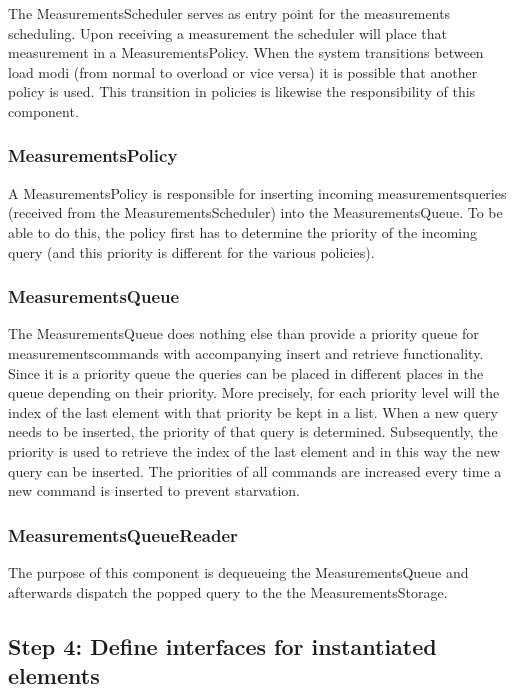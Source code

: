 \npar The MeasurementsScheduler serves as entry point for the measurements
scheduling. Upon receiving a measurement the scheduler will place that
measurement in a MeasurementsPolicy. When the system transitions between load
modi (from normal to overload or vice versa) it is possible that another policy
is used. This transition in policies is likewise the responsibility of this
component.

\subsubsection{MeasurementsPolicy}

\npar A MeasurementsPolicy is responsible for inserting incoming
measurementsqueries (received from the MeasurementsScheduler) into the
MeasurementsQueue. To be able to do this, the policy first has to determine the
priority of the incoming query (and this priority is different for the various
policies).

\subsubsection{MeasurementsQueue}

\npar The MeasurementsQueue does nothing else than provide a priority queue for
measurementscommands with accompanying insert and retrieve functionality. Since
it is a priority queue the queries can be placed in different places in the
queue depending on their priority. More precisely, for each priority level will
the index of the last element with that priority be kept in a list. When a new
query needs to be inserted, the priority of that query is determined.
Subsequently, the priority is used to retrieve the index of the last element and
in this way the new query can be inserted. The priorities of all commands are
increased every time a new command is inserted to prevent starvation.

\subsubsection{MeasurementsQueueReader}

\npar The purpose of this component is dequeueing the MeasurementsQueue and
afterwards dispatch the popped query to the the MeasurementsStorage.

\subsection{Step 4: Define interfaces for instantiated elements}
\label{add:it3/interfaces}

